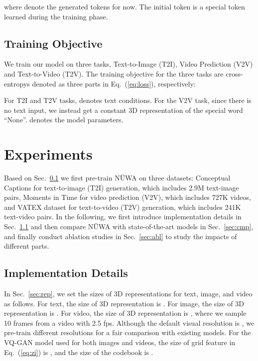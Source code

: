 \documentclass[10pt,twocolumn,letterpaper]{article}
\begin{document}
where  denote the generated tokens for now. The initial token  is a special  token learned during the training phase.
\subsection{Training Objective}\label{sec:training}
We train our model on three tasks, Text-to-Image (T2I), Video Prediction (V2V) and Text-to-Video (T2V). The training objective for the three tasks are cross-entropys denoted as three parts in Eq.~(\ref{eq:loss}), respectively:

For T2I and T2V tasks,  denotes text conditions. For the V2V task, since there is no text input, we instead get a constant 3D representation  of the special word ``None''.  denotes the model parameters.


\section{Experiments} \label{sec:exp}
Based on Sec.~\ref{sec:training} we first pre-train NÜWA on three datasets: Conceptual Captions\cite{linMicrosoftCocoCommon2014} for text-to-image (T2I) generation, which includes 2.9M text-image pairs, 
Moments in Time\cite{monfortMomentsTimeDataset2019} for video prediction (V2V), which includes 727K videos, 
and VATEX dataset\cite{wangVatexLargescaleHighquality2019} for text-to-video (T2V) generation, which includes 241K text-video pairs. In the following, we first introduce implementation details in Sec.~\ref{sec:imp} and then compare NÜWA with state-of-the-art models in Sec.~\ref{sec:cmp}, and finally conduct ablation studies in Sec.~\ref{sec:abl} to study the impacts of different parts.







\subsection{Implementation Details} \label{sec:imp}
In Sec.~\ref{sec:rep}, we set the sizes of 3D representations for text, image, and video as follows.
For text, the size of 3D representation is . 
For image, the size of 3D representation is .
For video, the size of 3D representation is , where we sample 10 frames from a video with 2.5 fps. Although the default visual resolution is , we pre-train different resolutions for a fair comparison with existing models.
For the VQ-GAN model used for both images and videos, the size of grid feature  in Eq.~(\ref{eq:zi}) is , and the size of the codebook  is .
\end{document}
